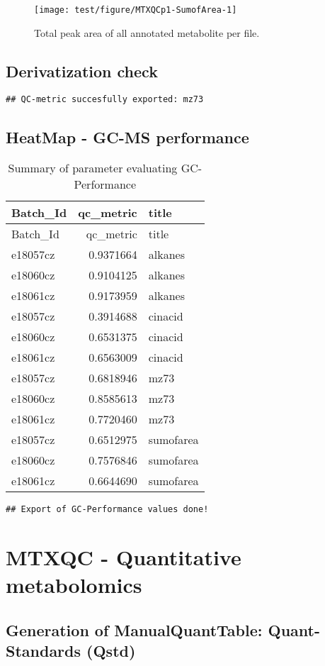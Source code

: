 \documentclass[9pt,]{article}
\begin{document}
\begin{figure}

{\centering \texttt{[image: test/figure/MTXQCp1-SumofArea-1]} 

}

\caption{Total peak area of all annotated metabolite per file.}\label{fig:SumofArea}
\end{figure}

\subsection{Derivatization check}\label{derivatization-check}

\begin{verbatim}
## QC-metric succesfully exported: mz73
\end{verbatim}

\subsection{HeatMap - GC-MS
performance}\label{heatmap---gc-ms-performance}

\begin{longtable}[]{@{}lrl@{}}
\caption{Summary of parameter evaluating GC-Performance}\tabularnewline
\toprule
Batch\_Id & qc\_metric & title\tabularnewline
\midrule
\endfirsthead
\toprule
Batch\_Id & qc\_metric & title\tabularnewline
\midrule
\endhead
e18057cz & 0.9371664 & alkanes\tabularnewline
e18060cz & 0.9104125 & alkanes\tabularnewline
e18061cz & 0.9173959 & alkanes\tabularnewline
e18057cz & 0.3914688 & cinacid\tabularnewline
e18060cz & 0.6531375 & cinacid\tabularnewline
e18061cz & 0.6563009 & cinacid\tabularnewline
e18057cz & 0.6818946 & mz73\tabularnewline
e18060cz & 0.8585613 & mz73\tabularnewline
e18061cz & 0.7720460 & mz73\tabularnewline
e18057cz & 0.6512975 & sumofarea\tabularnewline
e18060cz & 0.7576846 & sumofarea\tabularnewline
e18061cz & 0.6644690 & sumofarea\tabularnewline
\bottomrule
\end{longtable}

\begin{verbatim}
## Export of GC-Performance values done!
\end{verbatim}

\section{MTXQC - Quantitative
metabolomics}\label{mtxqc---quantitative-metabolomics}

\subsection{Generation of ManualQuantTable: Quant-Standards
(Qstd)}\label{generation-of-manualquanttable-quant-standards-qstd}
\end{document}
